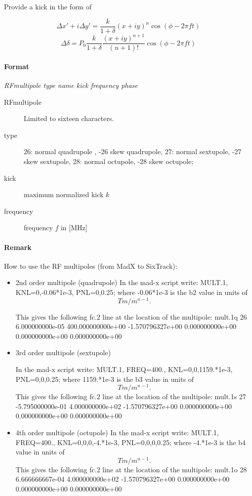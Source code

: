 \documentclass[a4paper,11pt]{report}
\begin{document}
Provide a kick in the form of 

$$
\Delta x'+i\Delta y'= \frac{k}{1+\delta} (x+iy)^n \cos (\phi - 2 \pi f t)
$$
$$
\Delta \delta= P_0 \frac{k}{1+\delta} \frac{(x+iy)^{n+1}}{(n+1)!} \cos (\phi - 2 \pi f t)
$$



\paragraph{Format} {\em RFmultipole type name kick frequency phase}
\begin{description}
\item [RFmultipole] Limited to sixteen characters.
\item [type] 26: normal quadrupole , -26 skew quadrupole,
             27: normal sextupole, -27 skew sextupole,
	     28: normal octupole, -28 skew octupole;
\item [kick] maximum normalized kick $k$
\item [frequency] frequency $f$ in [MHz]

\end{description}


\paragraph{Remark}

How to use the RF multipoles (from MadX to SixTrack):

\begin{itemize}
  \item 2nd order multipole (quadrupole)
In the mad-x script write: 
MULT.1, KNL={0,-0.06*1e-3}, PNL={0,0.25};
where -0.06*1e-3 is the b2 value in units of 
$$
Tm/m^{n-1}.
$$

This gives the following fc.2 line at the location of the multipole: 
mult.1q           26   6.000000000e-05   400.000000000e+00   -1.570796327e+00    0.000000000e+00    0.000000000e+00    0.000000000e+00

\item 3rd order multipole (sextupole)

In the mad-x script write:
MULT.1, FREQ=400., KNL={0,0,1159.*1e-3}, PNL={0,0,0.25};
where 1159.*1e-3 is the b3 value in units of
$$
Tm/m^{n-1}.
$$
This gives the following fc.2 line at the location of the multipole:
mult.1s           27  -5.795000000e-01   4.000000000e+02   -1.570796327e+00    0.000000000e+00    0.000000000e+00    0.000000000e+00

\item 4th order multipole (octupole)
In  the mad-x script write:
MULT.1, FREQ=400., KNL={0,0,0,-4.*1e-3}, PNL={0,0,0,0.25};
where -4.*1e-3 is the b4 value in units of
$$
Tm/m^{n-1}.
$$
This gives the following fc.2 line at the location of the multipole:
mult.1o           28   6.666666667e-04   4.000000000e+02   -1.570796327e+00    0.000000000e+00    0.000000000e+00    0.000000000e+00

\end{itemize}
\end{document}
